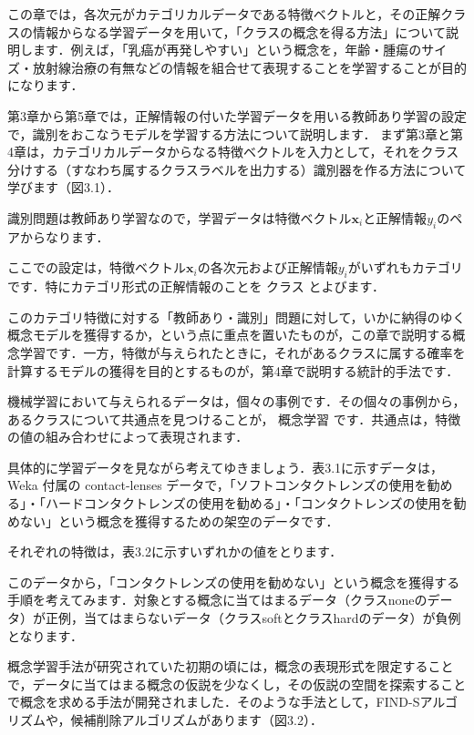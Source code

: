 
この章では，各次元がカテゴリカルデータである特徴ベクトルと，その正解クラスの情報からなる学習データを用いて，「クラスの概念を得る方法」について説明します．例えば，「乳癌が再発しやすい」という概念を，年齢・腫瘍のサイズ・放射線治療の有無などの情報を組合せて表現することを学習することが目的になります．


第3章から第5章では，正解情報の付いた学習データを用いる教師あり学習の設定で，識別をおこなうモデルを学習する方法について説明します．
まず第3章と第4章は，カテゴリカルデータからなる特徴ベクトルを入力として，それをクラス分けする（すなわち属するクラスラベルを出力する）識別器を作る方法について学びます（図3.1）．


識別問題は教師あり学習なので，学習データは特徴ベクトル$\bm{x}_i$と正解情報$y_i$のペアからなります．

ここでの設定は，特徴ベクトル$\bm{x}_i$の各次元および正解情報$y_i$がいずれもカテゴリです．特にカテゴリ形式の正解情報のことを
クラス
とよびます．

このカテゴリ特徴に対する「教師あり・識別」問題に対して，いかに納得のゆく概念モデルを獲得するか，という点に重点を置いたものが，この章で説明する概念学習です．一方，特徴が与えられたときに，それがあるクラスに属する確率を計算するモデルの獲得を目的とするものが，第4章で説明する統計的手法です．


機械学習において与えられるデータは，個々の事例です．その個々の事例から，あるクラスについて共通点を見つけることが，
概念学習
です．共通点は，特徴の値の組み合わせによって表現されます．


具体的に学習データを見ながら考えてゆきましょう．表3.1に示すデータは，Weka 付属の contact-lenses データで，「ソフトコンタクトレンズの使用を勧める」・「ハードコンタクトレンズの使用を勧める」・「コンタクトレンズの使用を勧めない」という概念を獲得するための架空のデータです．

それぞれの特徴は，表3.2に示すいずれかの値をとります．

このデータから，「コンタクトレンズの使用を勧めない」という概念を獲得する手順を考えてみます．対象とする概念に当てはまるデータ（クラスnoneのデータ）が正例，当てはまらないデータ（クラスsoftとクラスhardのデータ）が負例となります．


概念学習手法が研究されていた初期の頃には，概念の表現形式を限定することで，データに当てはまる概念の仮説を少なくし，その仮説の空間を探索することで概念を求める手法が開発されました．そのような手法として，FIND-Sアルゴリズムや，候補削除アルゴリズムがあります（図3.2）．

